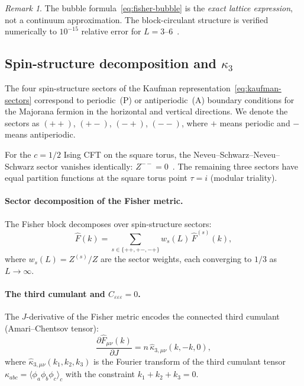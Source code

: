 \documentclass[11pt]{article}
\theoremstyle{definition}
\theoremstyle{remark}
\newtheorem{remark}[theorem]{Remark}
\newcommand{\Fish}{F}
\begin{document}
\begin{remark}
The bubble formula~\eqref{eq:fisher-bubble} is the
\emph{exact lattice expression}, not a continuum approximation.
The block-circulant structure is verified numerically to
$10^{-15}$ relative error for $L = 3$--$6$~\cite{PredLetter}.
\end{remark}


\subsection{Spin-structure decomposition and $\kappa_3$}
\label{subsec:spin-structure}

The four spin-structure sectors of the Kaufman
representation~\eqref{eq:kaufman-sectors} correspond to
periodic~(P) or antiperiodic~(A) boundary conditions for the
Majorana fermion in the horizontal and vertical directions.
We denote the sectors as $(++)$, $(+-)$, $(-+)$, $(--)$, where
$+$ means periodic and $-$ means antiperiodic.

For the $c = 1/2$ Ising CFT on the square torus, the
Neveu--Schwarz--Neveu--Schwarz sector vanishes identically:
$Z^{--} = 0$~\cite{McCoyWu1973}. The remaining three sectors
have equal partition functions at the square torus point $\tau = i$
(modular triality).

\paragraph{Sector decomposition of the Fisher metric.}
The Fisher block decomposes over spin-structure sectors:
\begin{equation}
  \hat{\Fish}(k) = \sum_{s \in \{++, +-, -+\}}
    w_s(L)\,\hat{\Fish}^{(s)}(k),
  \label{eq:sector-fisher}
\end{equation}
where $w_s(L) = Z^{(s)}/Z$ are the sector weights, each converging
to $1/3$ as $L \to \infty$.

\paragraph{The third cumulant and $C_{\varepsilon\varepsilon\varepsilon} = 0$.}
The $J$-derivative of the Fisher metric encodes the connected third
cumulant (Amari--Chentsov tensor):
\begin{equation}
  \frac{\partial\hat{\Fish}_{\mu\nu}(k)}{\partial J}
    = n\,\hat{\kappa}_{3,\mu\nu}(k, -k, 0),
  \label{eq:dF-kappa3}
\end{equation}
where $\hat{\kappa}_{3,\mu\nu}(k_1, k_2, k_3)$ is the Fourier transform
of the third cumulant tensor $\kappa_{abc} = \langle\phi_a\phi_b\phi_c
\rangle_c$ with the constraint $k_1 + k_2 + k_3 = 0$.
\end{document}
